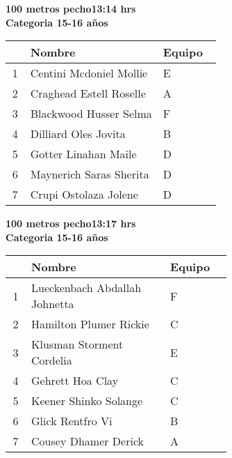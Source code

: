 \begin{minipage}{0.95\linewidth}\vspace{0.5cm} 
\begin{flushleft}
\textbf{
\hspace{-0.15cm}100 metros pecho\hspace{1.5cm}13:14 hrs \\Categoria 15-16 años}\vspace{-0.2cm} 
\end{flushleft}
\begin{tabular}{cp{0.63\linewidth}l}
\hline
& \textbf{Nombre} & \textbf{Equipo} \\ \hline
1 & Centini Mcdoniel Mollie & E \\ 
2 & Craghead Estell Roselle & A \\ 
3 & Blackwood Husser Selma & F \\ 
4 & Dilliard Oles Jovita & B \\ 
5 & Gotter Linahan Maile & D \\ 
6 & Maynerich Saras Sherita & D \\ 
7 & Crupi Ostolaza Jolene & D \\ 
\end{tabular}
\end{minipage}
\begin{minipage}{0.95\linewidth}\vspace{0.5cm} 
\begin{flushleft}
\textbf{
\hspace{-0.15cm}100 metros pecho\hspace{1.5cm}13:17 hrs \\Categoria 15-16 años}\vspace{-0.2cm} 
\end{flushleft}
\begin{tabular}{cp{0.63\linewidth}l}
\hline
& \textbf{Nombre} & \textbf{Equipo} \\ \hline
1 & Lueckenbach Abdallah Johnetta & F \\ 
2 & Hamilton Plumer Rickie & C \\ 
3 & Klusman Storment Cordelia & E \\ 
4 & Gehrett Hoa Clay & C \\ 
5 & Keener Shinko Solange & C \\ 
6 & Glick Rentfro Vi & B \\ 
7 & Cousey Dhamer Derick & A \\ 
\end{tabular}
\end{minipage}
